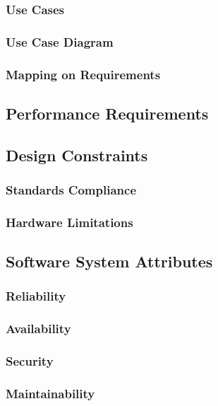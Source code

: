 \documentclass{article}
\begin{document}
\subsubsection{Use Cases}

\subsubsection{Use Case Diagram}

\subsubsection{Mapping on Requirements}

\subsection{Performance Requirements}

\subsection{Design Constraints}

\subsubsection{Standards Compliance}

\subsubsection{Hardware Limitations}

\subsection{Software System Attributes}

\subsubsection{Reliability}

\subsubsection{Availability}

\subsubsection{Security}

\subsubsection{Maintainability}
\end{document}
